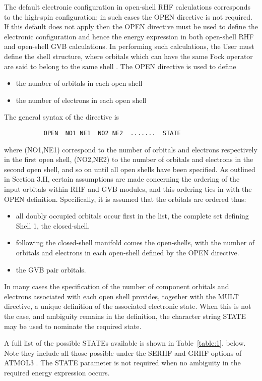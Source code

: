 \documentclass[11pt,fleqn]{article}
\begin{document}
The default electronic configuration in open-shell RHF calculations
corresponds to the high-spin configuration; in such cases the
OPEN directive is not required. If this default does not apply
then the OPEN directive must be used to define the electronic configuration
and hence the energy expression in both open-shell RHF and open-shell
GVB calculations. In performing such calculations, the User must define
the shell structure, where orbitals which can have the same Fock
operator are said to belong to the same shell \cite{bobrow}.
The OPEN directive is used to define
\begin{itemize}
\item  the number of orbitals in each open shell
\item  the number of electrons in each open shell
\end{itemize}
 The general syntax of the directive is
{
\footnotesize
\begin{verbatim}
           OPEN  NO1 NE1  NO2 NE2  .......  STATE
\end{verbatim}
}
where (NO1,NE1) correspond to the number of orbitals and electrons
respectively in the first open shell, (NO2,NE2) to the number of
orbitals and electrons in the second open shell, and so on until
all open shells have been specified.
 As outlined in Section 3.II, certain assumptions are made
concerning the ordering of the input orbitals within RHF and GVB
modules, and this ordering ties in with the OPEN definition.
Specifically, it is assumed that the orbitals are ordered thus:

\begin{itemize}
\item  all doubly occupied orbitals occur first in the list, the
complete set defining Shell 1, the closed-shell.
\item  following the closed-shell manifold comes the open-shells, with
the number of orbitals and electrons in each open-shell defined
by the OPEN directive.
\item  the GVB pair orbitals.
\end{itemize}

In many cases the specification of the number of component orbitals and
electrons associated with each open shell provides, together with the
MULT directive, a unique definition of the associated electronic
state.  When this is not the case, and ambiguity remains in the
definition, the character string STATE may be used to nominate the
required state.

A full list of the possible STATEs available is shown 
in Table~\ref{table:1}.
below. Note they include all those possible under the SERHF
and GRHF options of ATMOL3 \cite{moncrieff}.
The STATE parameter is not required when no ambiguity
in the required energy expression occurs.\\
\end{document}
